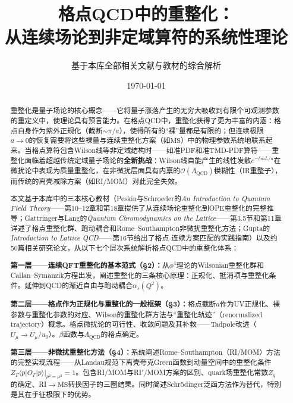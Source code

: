 \documentclass[12pt,a4paper]{ctexart}
\title{\heiti 格点QCD中的重整化：\\
从连续场论到非定域算符的系统性理论}
\author{基于本库全部相关文献与教材的综合解析}
\date{\today}
\theoremstyle{definition}
\begin{document}
\maketitle

\begin{abstract}
\noindent
重整化是量子场论的核心概念——它将量子涨落产生的无穷大吸收到有限个可观测参数的重定义中，使理论具有预言能力。在格点QCD中，重整化获得了更为丰富的内涵：格点自身作为紫外正规化（截断$\sim\pi/a$），使得所有的``裸''量都是有限的；但连续极限$a\to 0$的恢复需要将这些裸量与连续重整化方案（如$\overline{\text{MS}}$）中的物理参数系统地联系起来。当格点算符包含Wilson线等非定域结构时——如准PDF和准TMD-PDF算符——重整化面临着超越传统定域量子场论的\textbf{全新挑战}：Wilson线自能产生的线性发散$e^{-\delta\bar m L/a}$在微扰论中表现为质量重整化，在非微扰层面具有内禀的$\mathcal{O}(\Lambda_{\text{QCD}})$模糊性（IR重整子），而传统的离壳减除方案（如RI/MOM）对此完全失效。

本文基于本库中的三本核心教材（Peskin与Schroeder的\textit{An Introduction to Quantum Field Theory}——第10--12章和第18章提供了从连续场论重整化到OPE重整化的完整推导；Gattringer与Lang的\textit{Quantum Chromodynamics on the Lattice}——第3.5节和第11章详述了格点重整化群、跑动耦合和Rome--Southampton非微扰重整化方法；Gupta的\textit{Introduction to Lattice QCD}——第16节给出了格点-连续方案匹配的实践指南）以及约50篇相关研究论文，从以下七个层次系统解析格点QCD中的重整化体系：

\textbf{第一层——连续QFT重整化的基本范式（§2）：}从$\phi^4$理论的Wilsonian重整化群和Callan--Symanzik方程出发，阐述重整化的三条核心原理：正规化、抵消项与重整化条件。延伸到QCD的渐近自由与跑动耦合$\alpha_s(Q^2)$。

\textbf{第二层——格点作为正规化与重整化的一般框架（§3）：}格点截断$a$作为UV正规化、裸参数与重整化参数的对应、Wilson的重整化群方法与``重整化轨迹''（renormalized trajectory）概念。格点微扰论的可行性、收敛问题及其补救——Tadpole改进（$U_\mu\to U_\mu/u_0$）。$\beta$函数与$\Lambda_{\text{QCD}}$的格点确定。

\textbf{第三层——非微扰重整化方法（§4）：}系统阐述Rome--Southampton（RI/MOM）方法的完整实现流程——从Landau规范下离壳夸克Green函数到动量空间中的重整化条件$Z_\Gamma \langle p|O_\Gamma|p\rangle|_{p^2=\mu^2} = 1$。包含RI/MOM与RI$'$/MOM方案的区别、quark场重整化常数$Z_q$的确定、RI$\to\overline{\text{MS}}$转换因子的三圈结果。同时简述Schr\"odinger泛函方法作为替代，特别是其在手征极限下的优势。


\end{abstract}
\end{document}
